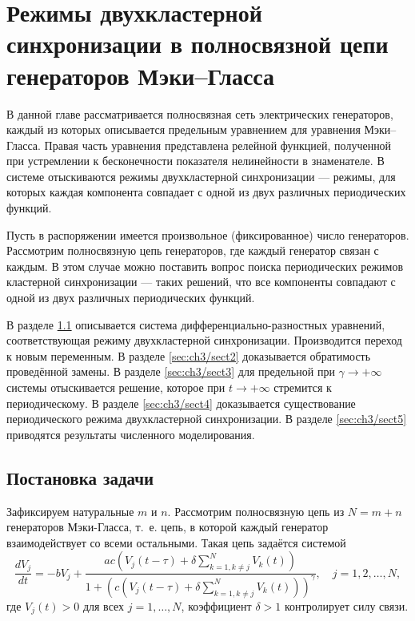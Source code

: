 \chapter{Режимы двухкластерной синхронизации в полносвязной цепи генераторов Мэки--Гласса}\label{ch:ch3}

В данной главе рассматривается полносвязная сеть электрических генераторов, каждый из которых описывается предельным уравнением для уравнения Мэки--Гласса. Правая часть уравнения представлена релейной функцией, полученной при устремлении к бесконечности показателя нелинейности в знаменателе. В системе отыскиваются режимы двухкластерной синхронизации --- режимы, для которых каждая компонента совпадает с одной из двух различных периодических функций.


Пусть в распоряжении имеется произвольное (фиксированное) число генераторов. Рассмотрим полносвязную цепь генераторов, где каждый генератор связан с каждым. В этом случае можно поставить вопрос поиска периодических режимов кластерной синхронизации --- таких решений, что все компоненты совпадают с одной из двух различных периодических функций.

В разделе \ref{sec:ch3/sect1} описывается система дифференциально-разностных уравнений, соответствующая режиму двухкластерной синхронизации. Производится переход к новым переменным. В разделе \ref{sec:ch3/sect2} доказывается обратимость проведённой замены. В разделе \ref{sec:ch3/sect3} для предельной при $\gamma \to +\infty$ системы отыскивается решение, которое при $t \to +\infty$ стремится к периодическому. В разделе \ref{sec:ch3/sect4} доказывается существование периодического режима двухкластерной синхронизации. В разделе \ref{sec:ch3/sect5} приводятся результаты численного моделирования.

\section{Постановка задачи}\label{sec:ch3/sect1}
Зафиксируем натуральные $m$ и $n$. Рассмотрим полносвязную цепь из $N = m + n$ генераторов Мэки-Гласса, т.~е. цепь, в которой каждый генератор взаимодействует со всеми остальными. Такая цепь задаётся системой
%
\begin{equation}
	\label{eq:mg_system}
	\dfrac{d V_{j}}{dt}= -bV_{j} + \dfrac{ac\left(V_{j}(t - \tau) + \delta\sum_{k=1,k\neq j}^{N}V_{k}(t)\right)}{1 + \left(c\left(V_{j}(t - \tau) + \delta\sum_{k=1,k\neq j}^{N}V_{k}(t)\right)\right)^{\gamma}}, \quad j=1, 2, \ldots, N,
\end{equation}
где $V_j(t) > 0$ для всех $j = 1, \ldots, N$, коэффициент $\delta > 1$ контролирует силу связи. 


